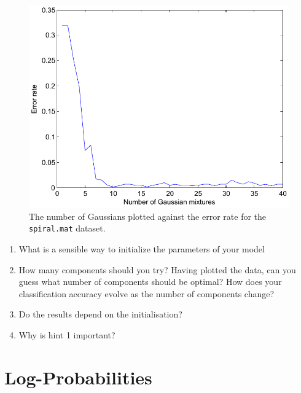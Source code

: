 \documentclass[a4paper,11pt]{article}
\begin{document}
\begin{figure}
\begin{center}
\caption{The number of Gaussians plotted against the error rate for the \texttt{spiral.mat} dataset.}
\label{fig:spiralerr}
\includegraphics[width=\textwidth]{spiralerr}
\end{center}
\end{figure}

\begin{enumerate}
\item What is a sensible way to initialize the parameters of your model
\item How many components should you try?  Having plotted the data, can you guess what number of components should be optimal?  How does your classification accuracy evolve as the number of components change?
\item Do the results depend on the initialisation?
\item Why is hint 1 important?
\end{enumerate}

\section{Log-Probabilities}
\end{document}
